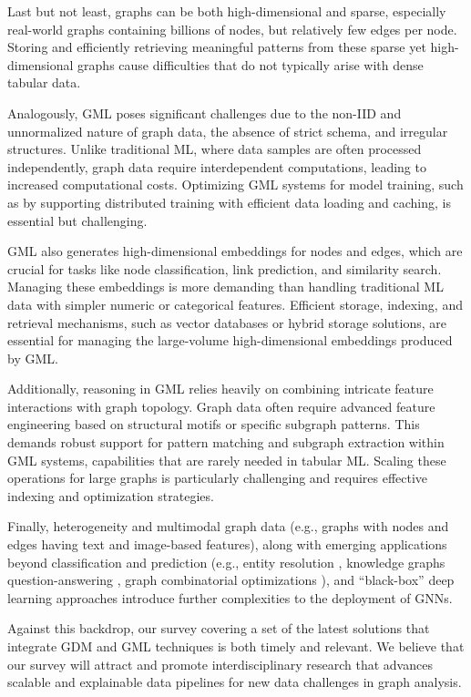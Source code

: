 \documentclass{sig-alternate-10pt}
\begin{document}
Last but not least, graphs can be both high-dimensional and sparse, especially real-world graphs containing billions of nodes, but relatively few edges per node. Storing and efficiently retrieving meaningful patterns from these sparse yet high-dimensional graphs cause difficulties that do not typically arise with dense tabular data.

Analogously, GML poses significant challenges due to the non-IID and unnormalized nature of graph data, the absence of strict schema, and irregular structures.
Unlike traditional ML, where data samples are often processed independently, graph data require interdependent computations, leading to increased computational costs.
Optimizing GML systems for model training, such as by supporting distributed training with efficient data loading and caching, is essential but challenging.

GML also generates high-dimensional embeddings for nodes and edges, which are crucial for tasks like node classification, link prediction, and similarity search. Managing these embeddings is more demanding than handling traditional ML data with simpler numeric or categorical features. Efficient storage, indexing, and retrieval mechanisms, such as vector databases or hybrid storage solutions, are essential for managing the large-volume high-dimensional embeddings produced by GML.

Additionally, reasoning in GML relies heavily on combining intricate feature interactions with graph topology.
Graph data often require advanced feature engineering based on structural motifs or specific subgraph patterns.
This demands robust support for pattern matching and subgraph extraction within GML systems, capabilities that are rarely needed in tabular ML.
Scaling these operations for large graphs is particularly challenging and requires effective indexing and optimization strategies.


Finally, heterogeneity and multimodal graph data (e.g., graphs with nodes and edges having text and image-based features), along with emerging applications beyond classification and prediction (e.g., entity resolution \cite{Li0SZAW20}, knowledge graphs question-answering \cite{YasunagaRBLL21}, graph combinatorial optimizations \cite{VelickovicYPHB20}), and ``black-box'' deep learning approaches introduce further complexities to the deployment of GNNs.

Against this backdrop, our survey
covering a set of the latest solutions that integrate GDM and GML techniques is both timely and relevant.
We believe that our survey will attract and promote interdisciplinary research
that advances
scalable and explainable data pipelines for new data challenges in graph analysis.
%
\end{document}
